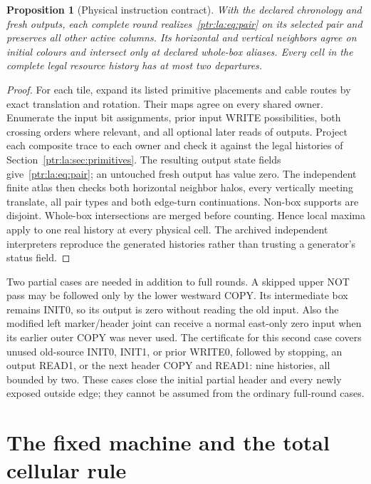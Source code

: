 \documentclass[11pt,letterpaper]{article}
\newtheorem{proposition}[theorem]{Proposition}
\theoremstyle{definition}\newtheorem{definition}[theorem]{Definition}
\theoremstyle{remark}\newtheorem{remark}[theorem]{Remark}
\begin{document}
\begin{proposition}[Physical instruction contract]\label{ptr:la:prop:physical}
With the declared chronology and fresh outputs, each complete round realizes~\eqref{ptr:la:eq:pair} on its selected pair and preserves all other active columns. Its horizontal and vertical neighbors agree on initial colours and intersect only at declared whole-box aliases. Every cell in the complete legal resource history has at most two departures.
\end{proposition}
\begin{proof}
For each tile, expand its listed primitive placements and cable routes by exact translation and rotation. Their maps agree on every shared owner. Enumerate the input bit assignments, prior input WRITE possibilities, both crossing orders where relevant, and all optional later reads of outputs. Project each composite trace to each owner and check it against the legal histories of Section~\ref{ptr:la:sec:primitives}. The resulting output state fields give~\eqref{ptr:la:eq:pair}; an untouched fresh output has value zero. The independent finite atlas then checks both horizontal neighbor halos, every vertically meeting translate, all pair types and both edge-turn continuations. Non-box supports are disjoint. Whole-box intersections are merged before counting. Hence local maxima apply to one real history at every physical cell. The archived independent interpreters reproduce the generated histories rather than trusting a generator's status field.
\end{proof}

Two partial cases are needed in addition to full rounds. A skipped upper NOT pass may be followed only by the lower westward COPY. Its intermediate box remains INIT0, so its output is zero without reading the old input. Also the modified left marker/header joint can receive a normal east-only zero input when its earlier outer COPY was never used. The certificate for this second case covers unused old-source INIT0, INIT1, or prior WRITE0, followed by stopping, an output READ1, or the next header COPY and READ1: nine histories, all bounded by two. These cases close the initial partial header and every newly exposed outside edge; they cannot be assumed from the ordinary full-round cases.

\section{The fixed machine and the total cellular rule}\label{ptr:la:sec:ca}
\end{document}

